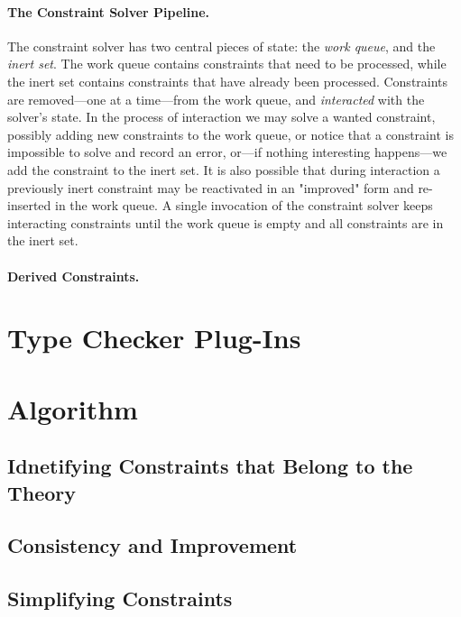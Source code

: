 \documentclass{sigplanconf}
\begin{document}
\paragraph{The Constraint Solver Pipeline.}
The constraint solver has two central pieces of state: the {\em work queue},
and the {\em inert set}.  The work queue contains constraints that need to be
processed, while the inert set contains constraints that have already
been processed.  Constraints are removed---one at a time---from the work queue,
and {\em interacted} with the solver's state.  In the process of interaction
we may solve a wanted constraint, possibly adding new constraints to the
work queue, or notice that a constraint is impossible to solve and record
an error, or---if nothing interesting happens---we add the constraint
to the inert set.  It is also possible that during interaction a previously
inert constraint may be reactivated in an "improved" form and re-inserted
in the work queue.  A single invocation of the constraint solver keeps
interacting constraints until the work queue is empty and all constraints
are in the inert set.

\paragraph{Derived Constraints.}


\section{Type Checker Plug-Ins}


\section{Algorithm}

\subsection{Idnetifying Constraints that Belong to the Theory}

\subsection{Consistency and Improvement}

\subsection{Simplifying Constraints}
\end{document}
